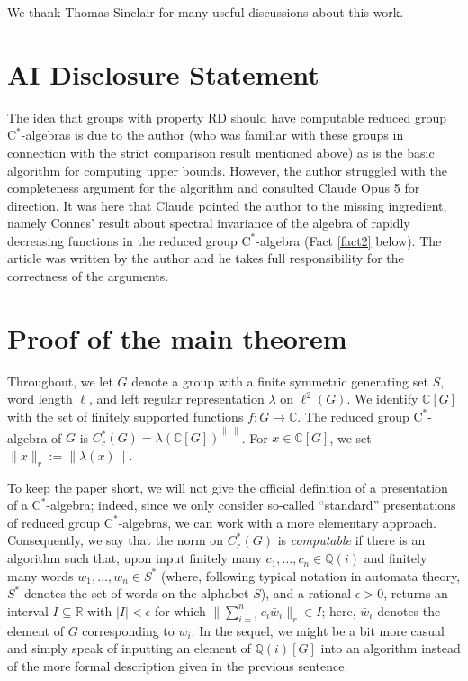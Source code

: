 \documentclass[10pt,a4paper]{amsart}
\newcommand{\C}{\mathbb{C}}
\newcommand{\cstar}{$\mathrm{C}^*$}
\newcommand{\Cr}{C^*_r(G)}
\theoremstyle{plain}
\theoremstyle{definition}
\numberwithin{equation}{section}
\begin{document}
We thank Thomas Sinclair for many useful discussions about this work.

\section*{AI Disclosure Statement}

The idea that groups with property RD should have computable reduced group \cstar-algebras is due to the author (who was familiar with these groups in connection with the strict comparison result mentioned above) as is the basic algorithm for computing upper bounds.  However, the author struggled with the completeness argument for the algorithm and consulted Claude Opus 5 for direction.  It was here that Claude pointed the author to the missing ingredient, namely Connes' result about spectral invariance of the algebra of rapidly decreasing functions in the reduced group \cstar-algebra (Fact \ref{fact2} below).  The article was written by the author and he takes full responsibility for the correctness of the arguments. 

\section{Proof of the main theorem}

Throughout, we let $G$ denote a group with a finite symmetric generating set $S$, word length $\ell$, and left regular representation $\lambda$ on $\ell^2(G)$. We identify $\mathbb{C}[G]$ with the set of finitely supported functions $f:G\to \mathbb{C}$.  The reduced group \cstar-algebra of $G$ is $\Cr=\overline{\lambda(\C[G])}^{\|\cdot\|}$. For $x\in \mathbb{C}[G]$, we set $\|x\|_r:=\|\lambda(x)\|$.

To keep the paper short, we will not give the official definition of a presentation of a \cstar-algebra; indeed, since we only consider so-called ``standard'' presentations of reduced group \cstar-algebras, we can work with a more elementary approach.  Consequently, we say that the norm on $C^*_r(G)$ is \emph{computable} if there is an algorithm such that, upon input finitely many $c_1,\ldots,c_n\in \mathbb{Q}(i)$ and finitely many words $w_1,\ldots,w_n\in S^*$ (where, following typical notation in automata theory, $S^*$ denotes the set of words on the alphabet $S$), and a rational $\epsilon>0$, returns an interval $I\subseteq \mathbb{R}$ with $|I|<\epsilon$ for which $\|\sum_{i=1}^n c_i\bar w_i\|_r\in I$; here, $\bar w_i$ denotes the element of $G$ corresponding to $w_i$.  In the sequel, we might be a bit more casual and simply speak of inputting an element of $\mathbb{Q}(i)[G]$ into an algorithm instead of the more formal description given in the previous sentence.
\end{document}
